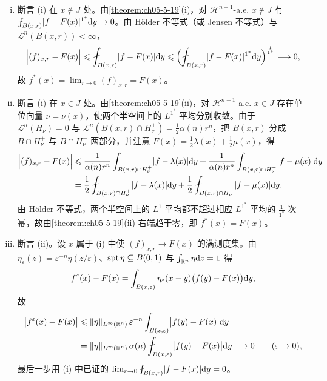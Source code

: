 \documentclass[../../main.tex]{subfiles}%
\begin{document}
\begin{remark}\label{remark:ch05-thm-5-20-论证}
\begin{enumerate}[(i)]
\item 断言 (i) 在 $x\notin J$ 处。由\cref{theorem:ch05-5-19}(i)，对 $\mathcal{H}^{n-1}$-a.e. $x\notin J$ 有 $\fint_{B(x,r)}\lvert f-F(x)\rvert^{1^{*}}\diff y\to0$。由 Hölder 不等式（或 Jensen 不等式）与 $\mathcal{L}^n(B(x,r))<\infty$，%
\begin{align*}
\Bigl\lvert(f)_{x,r}-F(x)\Bigr\rvert\leqslant\fint_{B(x,r)}\lvert f-F(x)\rvert\diff y
\leqslant\Bigl(\fint_{B(x,r)}\lvert f-F(x)\rvert^{1^{*}}\diff y\Bigr)^{\frac{1}{1^{*}}}\longrightarrow0 ,
\end{align*}
故 $f^{*}(x)=\lim_{r\to0}(f)_{x,r}=F(x)$。
\item 断言 (i) 在 $x\in J$ 处。由\cref{theorem:ch05-5-19}(ii)，对 $\mathcal{H}^{n-1}$-a.e. $x\in J$ 存在单位向量 $\nu=\nu(x)$，使两个半空间上的 $L^{1^{*}}$ 平均分别收敛。由于 $\mathcal{L}^n(H_\nu)=0$ 与 $\mathcal{L}^n(B(x,r)\cap H_\nu^{\pm})=\frac12\alpha(n)r^n$，把 $B(x,r)$ 分成 $B\cap H_\nu^+$ 与 $B\cap H_\nu^-$ 两部分，并注意 $F(x)=\frac12\lambda(x)+\frac12\mu(x)$，得%
\begin{align*}
\Bigl\lvert(f)_{x,r}-F(x)\Bigr\rvert
&\leqslant\frac{1}{\alpha(n)r^n}\int_{B(x,r)\cap H_\nu^+}\lvert f-\lambda(x)\rvert\diff y
+\frac{1}{\alpha(n)r^n}\int_{B(x,r)\cap H_\nu^-}\lvert f-\mu(x)\rvert\diff y\\
&=\frac12\fint_{B(x,r)\cap H_\nu^+}\lvert f-\lambda(x)\rvert\diff y
+\frac12\fint_{B(x,r)\cap H_\nu^-}\lvert f-\mu(x)\rvert\diff y .
\end{align*}
由 Hölder 不等式，两个半空间上的 $L^1$ 平均都不超过相应 $L^{1^{*}}$ 平均的 $\frac{1}{1^{*}}$ 次幂，故由\cref{theorem:ch05-5-19}(ii) 右端趋于零，即 $f^{*}(x)=F(x)$。%
\item 断言 (ii)。设 $x$ 属于 (i) 中使 $(f)_{x,r}\to F(x)$ 的满测度集。由 $\eta_\varepsilon(z)=\varepsilon^{-n}\eta(z/\varepsilon)$、$\operatorname{spt}\eta\subseteq B(0,1)$ 与 $\int_{\mathbb{R}^n}\eta\mathrm{d} z=1$ 得
\begin{align*}
f^{\varepsilon}(x)-F(x)=\int_{B(x,\varepsilon)}\eta_\varepsilon(x-y)\bigl(f(y)-F(x)\bigr)\mathrm{d} y ,
\end{align*}
故
\begin{align*}
\bigl\lvert f^{\varepsilon}(x)-F(x)\bigr\rvert
&\leqslant\lVert\eta\rVert_{L^{\infty}(\mathbb{R}^n)}\,\varepsilon^{-n}\int_{B(x,\varepsilon)}\bigl\lvert f(y)-F(x)\bigr\rvert\diff y\\
&=\lVert\eta\rVert_{L^{\infty}(\mathbb{R}^n)}\,\alpha(n)\fint_{B(x,\varepsilon)}\bigl\lvert f(y)-F(x)\bigr\rvert\diff y\longrightarrow0\qquad(\varepsilon\to0),
\end{align*}
最后一步用 (i) 中已证的 $\lim_{r\to0}\fint_{B(x,r)}\lvert f-F(x)\rvert\diff y=0$。
\end{enumerate}
\end{remark}
\end{document}
